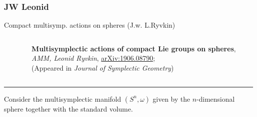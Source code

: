 \documentclass[handout,10pt]{beamer}
\newcommand{\extrarule}{
		{
			\color{UniGreen}
			\par\hspace*{-\dimexpr0.5\paperwidth-0.5\textwidth}\rule[0.5\baselineskip]{\paperwidth}{0.4pt}
			\vspace{-2em}
		}
}
\begin{document}
\subsubsection{JW Leonid}
	\begin{frame}[t]{Compact multisymp. actions on spheres \small (J.w. L.Ryvkin)}
		\begin{columns}[T]
			\begin{column}{0.2\textwidth}
				\centering
			\end{column}		
			\begin{column}{0.8\textwidth}
				\begin{center}
					\textbf{Multisymplectic actions of compact Lie groups on spheres}, \\
					\emph{AMM, Leonid Ryvkin}, \href{https://arxiv.org/abs/1906.08790}{arXiv:1906.08790};\\
					(Appeared in \emph{Journal of Symplectic Geometry})	
				\end{center}		
			\end{column}		
		\end{columns}				
		\extrarule
		\pause
		\vspace{1em}
		
		Consider the multisymplectic manifold $(S^n,\omega)$ given by the $n$-dimensional sphere together with the standard volume.
		

\end{frame}
\end{document}
